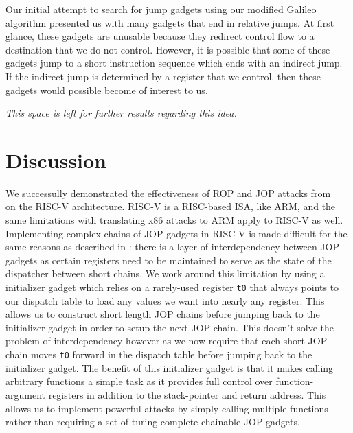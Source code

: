Our initial attempt to search for jump gadgets using our modified Galileo
algorithm presented us with many gadgets that end in relative jumps. At first
glance, these gadgets are unusable because they redirect control flow to a
destination that we do not control. However, it is possible that some of these
gadgets jump to a short instruction sequence which ends with an indirect jump.
If the indirect jump is determined by a register that we control, then these
gadgets would possible become of interest to us.

\textit{This space is left for further results regarding this idea.}


\section{Discussion}

We successully demonstrated the effectiveness of ROP and JOP attacks from
~\cite{checkoway10ropnoret,bletsch11jopx86,sadeghi15tinyjop} on the RISC-V
architecture. RISC-V is a RISC-based ISA, like ARM, and the same limitations
with translating x86 attacks to ARM apply to RISC-V as well. Implementing
complex chains of JOP gadgets in RISC-V is made difficult for the same reasons
as described in \cite{bletsch11jopx86}: there is a layer of interdependency
between JOP gadgets as certain registers need to be maintained to serve as the
state of the dispatcher between short chains. We work around this limitation
by using a initializer gadget which relies on a rarely-used register \verb|t0|
that always points to our dispatch table to load any values we want into nearly
any register. This allows us to construct short length JOP chains before
jumping back to the initializer gadget in order to setup the next JOP chain.
This doesn't solve the problem of interdependency however as we now require
that each short JOP chain moves \verb|t0| forward in the dispatch table before
jumping back to the initializer gadget. The benefit of this initializer
gadget is that it makes calling arbitrary functions a simple task as it provides
full control over function-argument registers in addition to the stack-pointer and
return address. This allows us to implement powerful attacks by simply calling
multiple functions rather than requiring a set of turing-complete chainable JOP gadgets.

